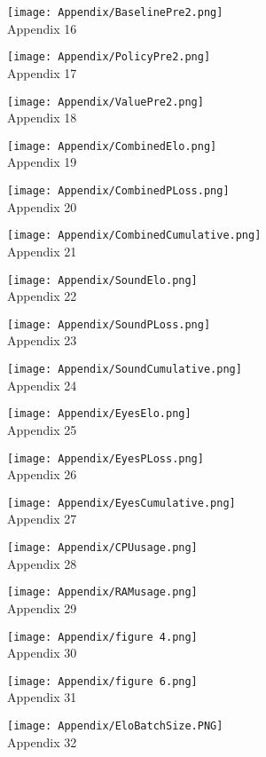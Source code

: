 \documentclass{LSkill}
\begin{document}
\begin{appendix}
\texttt{[image: Appendix/BaselinePre2.png]}\\
Appendix 16

\texttt{[image: Appendix/PolicyPre2.png]}\\
Appendix 17

\texttt{[image: Appendix/ValuePre2.png]}\\
Appendix 18

\texttt{[image: Appendix/CombinedElo.png]}\\
Appendix 19

\texttt{[image: Appendix/CombinedPLoss.png]}\\
Appendix 20

\texttt{[image: Appendix/CombinedCumulative.png]}\\
Appendix 21

\texttt{[image: Appendix/SoundElo.png]}\\
Appendix 22

\texttt{[image: Appendix/SoundPLoss.png]}\\
Appendix 23

\texttt{[image: Appendix/SoundCumulative.png]}\\
Appendix 24

\texttt{[image: Appendix/EyesElo.png]}\\
Appendix 25

\texttt{[image: Appendix/EyesPLoss.png]}\\
Appendix 26

\texttt{[image: Appendix/EyesCumulative.png]}\\
Appendix 27

\texttt{[image: Appendix/CPUusage.png]}\\
Appendix 28

\texttt{[image: Appendix/RAMusage.png]}\\
Appendix 29

\texttt{[image: Appendix/figure 4.png]}\\
  \label{fig:Baseline Loss For Learning Rates}
Appendix 30

\texttt{[image: Appendix/figure 6.png]}\\
Appendix 31

\texttt{[image: Appendix/EloBatchSize.PNG]}\\
Appendix 32


\end{appendix}
\end{document}
